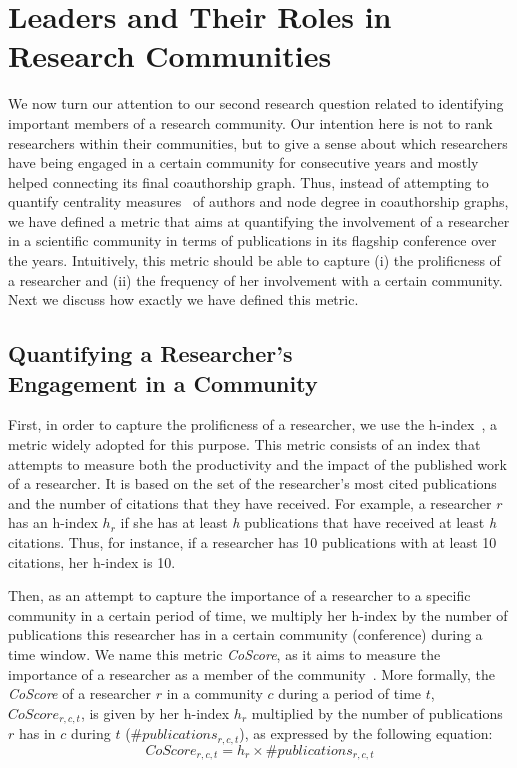 \documentclass{sig-alternate-10pt}
\begin{document}
\section{Leaders and Their Roles in \\Research Communities}

We now turn our attention to our second research question related to identifying important members of a research community. Our intention here is not to rank researchers within their communities, but  to give a sense about which researchers have being engaged in a certain community for consecutive years and mostly helped connecting its final coauthorship graph. Thus, instead of attempting to quantify centrality measures~\cite{freeman1977set,girvan2002community} of authors and node degree in coauthorship graphs, we have defined a metric that aims at quantifying the involvement of a researcher in a scientific community in terms of publications in its flagship conference over the years. Intuitively, this metric should be able to capture (i) the prolificness of a researcher and (ii) the frequency of her involvement with a certain community. Next we discuss how exactly we have defined this metric.


\subsection{Quantifying a Researcher's \\Engagement in a Community}

First, in order to capture the prolificness of a researcher, we use the h-index~\cite{Hirsch:2005}, a metric widely adopted for this purpose. This metric consists of an index that attempts to measure both the productivity and the impact of the published work of a researcher. It is based on the set of the researcher's most cited publications and the number of citations that they have received. For example, a researcher $r$ has an h-index $h_r$ if she has at least \textit{h} publications that have received at least \textit{h} citations. Thus, for instance, if a researcher has 10 publications with at least 10 citations, her h-index is 10.

Then, as an attempt to capture the importance of a researcher to a specific community in a certain period of time, we multiply her h-index by the number of publications this researcher has in a certain community (conference) during a time window. We name this metric \textit{CoScore}, as it aims to measure the importance of a researcher as a member of the community~\cite{Alves:2013}.
More formally, the \textit{CoScore} of a researcher $r$ in a community $c$ during a period of time $t$, $Co{ }Score_{r,c,t}$, is given by her h-index $h_r$ multiplied by the number of publications $r$ has in $c$ during $t$ ($\textrm{\#}publications_{r,c,t}$), as expressed by the following equation:
\begin{equation}
  \label{eq:core_score}
  CoScore_{r,c,t} = h_r \times \textrm{\#}publications_{r,c,t}
\end{equation}
\end{document}
